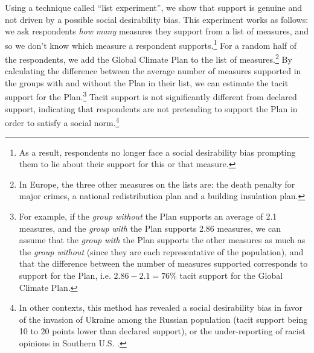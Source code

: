 \documentclass[a5paper,english,openany]{memoir}
\begin{document}
Using a technique called ``list experiment'', we show that support is genuine and not driven by a possible social desirability bias. This experiment works as follows: we ask respondents \textit{how many} measures they support from a list of measures, and so we don't know which measure a respondent supports.\footnote{As a result, respondents no longer face a social desirability bias prompting them to lie about their support for this or that measure.} 
For a random half of the respondents, we add the Global Climate Plan to the list of measures.\footnote{In Europe, the three other measures on the lists are: the death penalty for major crimes, a national redistribution plan and a building insulation plan.} 
By calculating the difference between the average number of measures supported in the groups with and without the Plan in their list, we can estimate the tacit support for the Plan.\footnote{For example, if the \textit{group without} the Plan supports an average of 2.1 measures, and the \textit{group with} the Plan supports 2.86 measures, we can assume that the \textit{group with} the Plan supports the other measures as much as the \textit{group without} (since they are each representative of the population), and that the difference between the number of measures supported corresponds to support for the Plan, i.e. $2.86 - 2.1 = 76\%$ tacit support for the Global Climate Plan.} %
Tacit support is not significantly different from declared support, indicating that respondents are not pretending to support the Plan in order to satisfy a social norm.\footnote{In other contexts, this method has revealed a social desirability bias in favor of the invasion of Ukraine among the Russian population (tacit support being 10 to 20 points lower than declared support), or the under-reporting of racist opinions in Southern U.S. \citep{kuklinski_racial_1997,chapkovski_solid_2022}.} 
\end{document}
